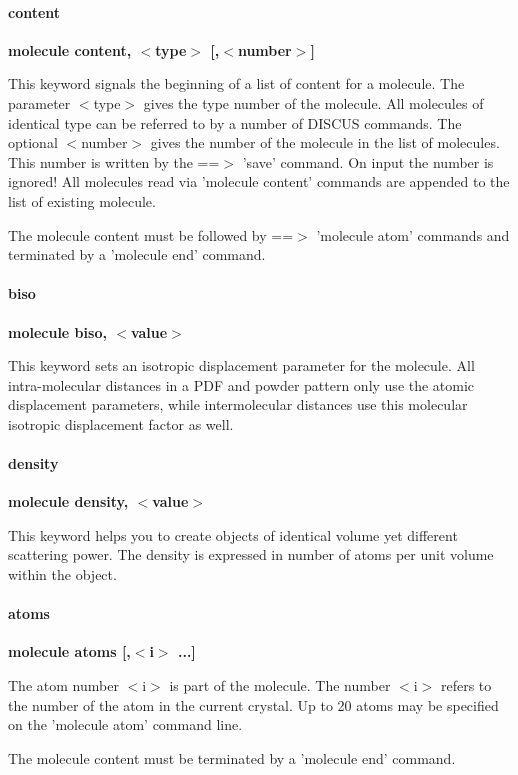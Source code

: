 \paragraph*{content}
{\bf molecule content, $ <$type$> $ [,$ <$number$> $] \par }
\par
\vspace{3pt}
This keyword signals the beginning of a list of content for a molecule. 
The parameter $ <$type$> $ gives the type number of the molecule. All molecules 
of identical type can be referred to by a number of DISCUS commands. 
The optional $ <$number$> $ gives the number of the molecule in the list of 
molecules. This number is written by the ==$> $ 'save' command. On input 
the number is ignored! All molecules read via 'molecule content' 
commands are appended to the list of existing molecule. 
\par
The molecule content must be followed by ==$> $ 'molecule atom' commands 
and terminated by a 'molecule end' command. 
\par
\paragraph*{biso}
{\bf molecule biso, $ <$value$> $ \par }
\par
\vspace{3pt}
This keyword sets an isotropic displacement parameter for the molecule. 
All intra-molecular distances in a PDF and powder pattern only use 
the atomic displacement parameters, while intermolecular distances 
use this molecular isotropic displacement factor as well. 
\paragraph*{density}
{\bf molecule density, $ <$value$> $ \par }
\par
\vspace{3pt}
This keyword helps you to create objects of identical volume yet 
different scattering power. The density is expressed in number of 
atoms per unit volume within the object. 
\paragraph*{atoms}
{\bf molecule atoms [,$ <$i$> $ ...] \par }
\par
\vspace{3pt}
The atom number $ <$i$> $ is part of the molecule. The number $ <$i$> $ refers to 
the number of the atom in the current crystal. Up to 20 atoms may be 
specified on the 'molecule atom' command line. 
\par
The molecule content must be terminated by a 'molecule end' command. 
\par

